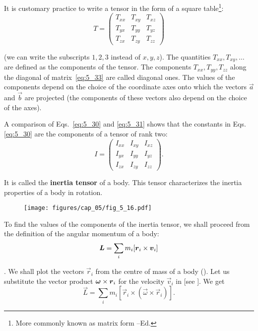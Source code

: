 It is customary practice to write a tensor in the form of a square table\footnote{More commonly known as matrix form --Ed.}:
\begin{equation}\label{eq:5_33}
	T = \begin{pmatrix}
		T_{xx}&T_{xy}&T_{xz}\\
		T_{yx}&T_{yy}&T_{yz}\\
		T_{zx}&T_{zy}&T_{zz}
		\end{pmatrix}
\end{equation}

\noindent
(we can write the subscripts $1, 2, 3$ instead of $x, y, z$). The quantities $T_{xx}, T_{xy}, \ldots$ are defined as the components of the tensor. The components $T_{xx}, T_{yy}, T_{zz}$ along the diagonal of matrix~\eqref{eq:5_33} are called diagonal ones. The values of the components depend on the choice of the coordinate axes onto which the vectors $\vec{a}$ and $\vec{b}$ are projected (the components of these vectors also depend on the choice of the axes).

A comparison of Eqs.~\eqref{eq:5_30} and \eqref{eq:5_31} shows that the constants in Eqs.\eqref{eq:5_30} are the components of a tensor of rank two:
\begin{equation}\label{eq:5_34}
	I = \begin{pmatrix}
		I_{xx}&I_{xy}&I_{xz}\\
		I_{yx}&I_{yy}&I_{yz}\\
		I_{zx}&I_{zy}&I_{zz}
	\end{pmatrix}.
\end{equation}

\noindent
It is called the \textbf{inertia tensor} of a body. This tensor characterizes the inertia properties of a body in rotation.

\begin{figure}[t]
	\begin{center}
		\texttt{[image: figures/cap\_05/fig\_5\_16.pdf]}
		\caption[]{}
		\label{fig:5_16}
	\end{center}
\vspace{-1.0cm}
\end{figure}

To find the values of the components of the inertia tensor, we shall proceed from the definition of the angular momentum of a body:
\begin{equation}\label{eq:5_35}
\boldsymbol{L} = \sum_i m_i [\boldsymbol{r}_{i}\times\boldsymbol{v}_{i}]
\end{equation}

. We shall plot the vectors $\vec{r}_i$ from the centre of mass of a body (). Let us substitute the vector product $\boldsymbol{\omega}\times\boldsymbol{r}_i$ for the velocity $\vec{v}_i$ in  [see ]. We get
\begin{equation*}
\vec{L} = \sum_i m_i [\vec{r}_i \times (\vec{\omega} \times \vec{r}_i)].
\end{equation*}


